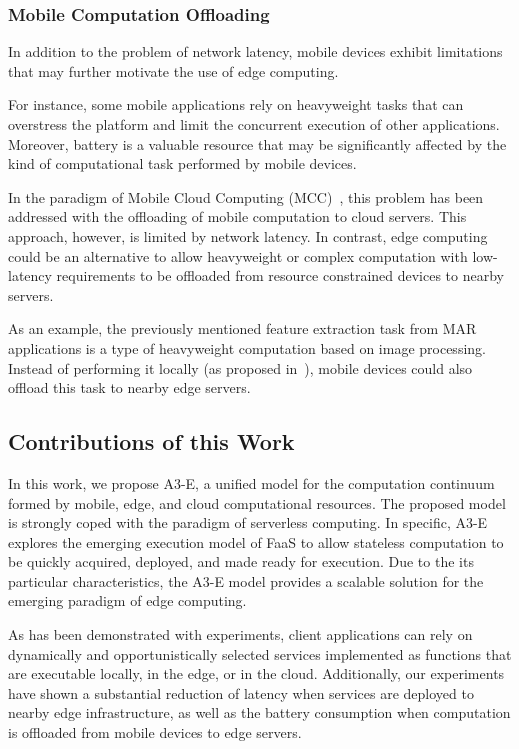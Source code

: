 \subsubsection{Mobile Computation Offloading}

In addition to the problem of network latency, mobile devices exhibit limitations that may further motivate the use of edge computing. 

For instance, some mobile applications rely on heavyweight tasks that can overstress the platform and limit the concurrent execution of other applications. Moreover, battery is a valuable resource that may be significantly affected by the kind of computational task performed by mobile devices. 

In the paradigm of Mobile Cloud Computing (MCC)~\cite{}, this problem has been addressed with the offloading of mobile computation to cloud servers. This approach, however, is limited by network latency. In contrast, edge computing could be an alternative to allow heavyweight or complex computation with low-latency requirements to be offloaded from resource constrained devices to nearby servers.


As an example, the previously mentioned feature extraction task from MAR applications is a type of heavyweight computation based on image processing. Instead of performing it locally (as proposed in~\cite{}), mobile devices could also offload this task to nearby edge servers. 

\subsection{Contributions of this Work}

In this work, we propose A3-E, a unified model for the computation continuum formed by mobile, edge, and cloud computational resources. The proposed model is strongly coped with the paradigm of serverless computing. In specific, A3-E explores the emerging execution model of FaaS to allow stateless computation to be quickly acquired, deployed, and made ready for execution. Due to the its particular characteristics, the A3-E model provides a scalable solution for the emerging paradigm of edge computing. 

As has been demonstrated with experiments, client applications can rely on dynamically and opportunistically selected services implemented as functions that are executable locally, in the edge, or in the cloud. Additionally, our experiments have shown a substantial reduction of latency when services are deployed to nearby edge infrastructure, as well as the battery consumption when computation is offloaded from mobile devices to edge servers.

